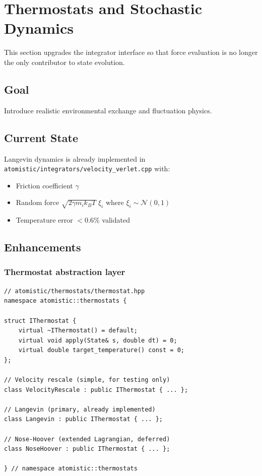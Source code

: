 \documentclass[11pt]{article}
\newcommand{\file}[1]{\texttt{#1}}
\begin{document}
\section{Thermostats and Stochastic Dynamics}
\label{sec:thermostats}

This section upgrades the integrator interface so that force evaluation is
no longer the only contributor to state evolution.

\subsection{Goal}

Introduce realistic environmental exchange and fluctuation physics.

\subsection{Current State}

Langevin dynamics is already implemented in
\file{atomistic/integrators/velocity\_verlet.cpp} with:
\begin{itemize}
  \item Friction coefficient $\gamma$
  \item Random force $\sqrt{2\gamma m_i k_B T}\;\xi_i$ where $\xi_i \sim \mathcal{N}(0,1)$
  \item Temperature error $< 0.6\%$ validated
\end{itemize}

\subsection{Enhancements}

\subsubsection{Thermostat abstraction layer}

\begin{lstlisting}
// atomistic/thermostats/thermostat.hpp
namespace atomistic::thermostats {

struct IThermostat {
    virtual ~IThermostat() = default;
    virtual void apply(State& s, double dt) = 0;
    virtual double target_temperature() const = 0;
};

// Velocity rescale (simple, for testing only)
class VelocityRescale : public IThermostat { ... };

// Langevin (primary, already implemented)
class Langevin : public IThermostat { ... };

// Nose-Hoover (extended Lagrangian, deferred)
class NoseHoover : public IThermostat { ... };

} // namespace atomistic::thermostats
\end{lstlisting}
\end{document}
